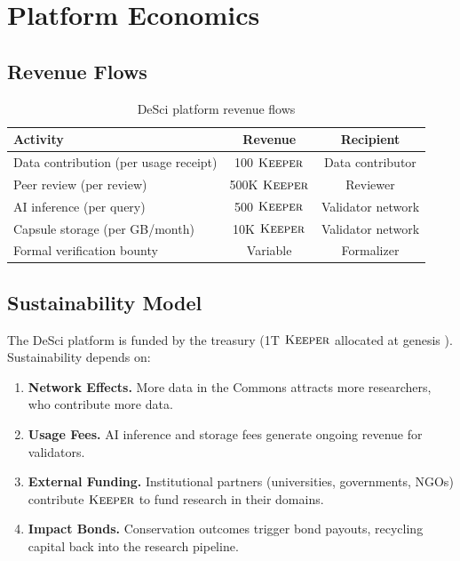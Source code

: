\section{Platform Economics}

\label{sec:economics}

\subsection{Revenue Flows}

\begin{table}[h]
\centering
\begin{tabular}{lcc}
\toprule
\textbf{Activity} & \textbf{Revenue} & \textbf{Recipient} \\
\midrule
Data contribution (per usage receipt) & 100 $\textsc{Keeper}$ & Data contributor \\
Peer review (per review) & 500K $\textsc{Keeper}$ & Reviewer \\
AI inference (per query) & 500 $\textsc{Keeper}$ & Validator network \\
Capsule storage (per GB/month) & 10K $\textsc{Keeper}$ & Validator network \\
Formal verification bounty & Variable & Formalizer \\
\bottomrule
\end{tabular}
\caption{DeSci platform revenue flows}
\label{tab:revenue}
\end{table}

\subsection{Sustainability Model}

The DeSci platform is funded by the \DAO{} treasury (1T $\textsc{Keeper}$ allocated at genesis \cite{zoo-tokenomics}). Sustainability depends on:

\begin{enumerate}
    \item \textbf{Network Effects.} More data in the Commons attracts more researchers, who contribute more data.
    \item \textbf{Usage Fees.} AI inference and storage fees generate ongoing revenue for validators.
    \item \textbf{External Funding.} Institutional partners (universities, governments, NGOs) contribute $\textsc{Keeper}$ to fund research in their domains.
    \item \textbf{Impact Bonds.} Conservation outcomes trigger bond payouts, recycling capital back into the research pipeline.
\end{enumerate}

